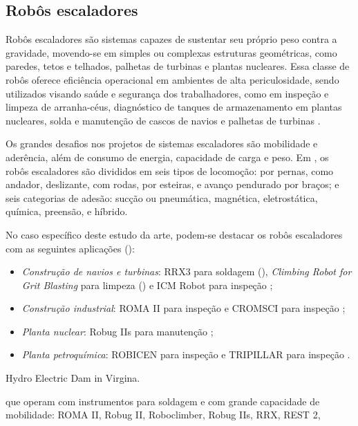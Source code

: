 \subsection{Robôs escaladores}
Robôs escaladores são sistemas capazes de sustentar seu próprio peso contra a
gravidade, movendo-se em simples ou complexas estruturas geométricas, como
paredes, tetos e telhados, palhetas de turbinas e plantas nucleares.
Essa classe de robôs oferece eficiência operacional em ambientes
de alta periculosidade, sendo utilizados visando saúde e segurança dos
trabalhadores, como em inspeção e limpeza de arranha-céus, diagnóstico de
tanques de armazenamento em plantas nucleares, solda e manutenção de cascos de
navios e palhetas de turbinas \cite{clawar}.

Os grandes desafios nos projetos de sistemas escaladores são mobilidade e
aderência, além de consumo de energia, capacidade de carga e peso. Em
\cite{modular}, os robôs escaladores são divididos em seis tipos de locomoção:
por pernas, como andador, deslizante, com rodas, por esteiras, e avanço
pendurado por braços; e seis categorias de adesão: sucção ou pneumática,
magnética, eletrostática, química, preensão, e híbrido. 

No caso específico deste estudo da arte, podem-se destacar os robôs escaladores
com as seguintes aplicações (\cite{climbsurv}): 

\begin{itemize}
  \item \emph{Construção de navios e turbinas}: RRX3 para soldagem
  (\cite{rrx3}), \emph{Climbing Robot for Grit Blasting} para limpeza
  (\cite{crgb}) e ICM Robot para inspeção \citep{icm};
  \item \emph{Construção industrial}: ROMA II para inspeção \citep{roma} e
  CROMSCI para inspeção \citep{CROMSCI};
 \item \emph{Planta nuclear}: Robug IIs para manutenção \citep{robug}; 
 \item \emph{Planta petroquímica}: ROBICEN para inspeção \citep{robicen} e
  TRIPILLAR para inspeção \citep{tripillar}.  
\end{itemize}

 Hydro Electric Dam in Virgina.

que operam com instrumentos para soldagem e com grande capacidade de mobilidade: ROMA II, Robug II, Roboclimber, Robug IIs, RRX, REST 2,
